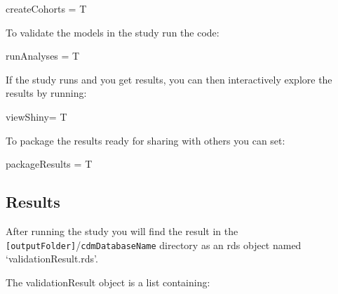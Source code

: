 \documentclass[
]{article}
\newenvironment{Shaded}{\begin{snugshade}}{\end{snugshade}}
\newcommand{\NormalTok}[1]{#1}
\newcommand{\StringTok}[1]{\textcolor[rgb]{0.31,0.60,0.02}{#1}}
\begin{document}
\begin{Shaded}
\begin{Highlighting}[]
\NormalTok{    createCohorts =}\StringTok{ }\NormalTok{T}
\end{Highlighting}
\end{Shaded}

To validate the models in the study run the code:

\begin{Shaded}
\begin{Highlighting}[]
\NormalTok{    runAnalyses =}\StringTok{ }\NormalTok{T}
\end{Highlighting}
\end{Shaded}

If the study runs and you get results, you can then interactively
explore the results by running:

\begin{Shaded}
\begin{Highlighting}[]
\NormalTok{    viewShiny=}\StringTok{ }\NormalTok{T}
\end{Highlighting}
\end{Shaded}

To package the results ready for sharing with others you can set:

\begin{Shaded}
\begin{Highlighting}[]
\NormalTok{    packageResults =}\StringTok{ }\NormalTok{T}
\end{Highlighting}
\end{Shaded}

\hypertarget{results}{%
\subsection{Results}\label{results}}

After running the study you will find the result in the
\texttt{{[}outputFolder{]}}/\texttt{cdmDatabaseName} directory as an rds
object named `validationResult.rds'.

The validationResult object is a list containing:
\end{document}
